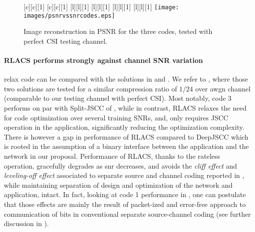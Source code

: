 \begin{figure}[t!]
\begin{center}
[c][c][1]{\scalebox{.8}{image reconstruction PSNR [dB]}}
[c][c][1]{\scalebox{.8}{channel signal to noise ratio [dB]}}
[l][l][1]{\scalebox{\textsizescale}{Code 1, not rateless}}
[l][l][1]{}
[l][l][1]{}
[l][l][1]{\scalebox{\textsizescale}{imperfect CSI, $\epsilon = 0.1$} }
\texttt{[image: images/psnrvssnrcodes.eps]}
\caption{Image reconstruction  in PSNR for the three  codes, tested with perfect CSI testing channel.}
\label{fig:psnrcodes}
\end{center}
\end{figure}

\paragraph*{RLACS performs strongly against channel SNR variation}   \gls{relax} code can be  compared with the solutions in \cite{bourtsoulatze19_deep_joint_sourc_chann_codin} and \cite{tung2024multilevelreliabilityinterfacesemantic}. We refer to  \cite[Figure~10]{tung2024multilevelreliabilityinterfacesemantic}, where those two solutions are tested for a similar compression ratio of $1/24$ over \gls{awgn} channel (comparable to our testing channel with perfect CSI). Most notably, code 3 performs on par with Split-JSCC of \cite{tung2024multilevelreliabilityinterfacesemantic}, while in contrast, RLACS relaxes the need for code optimization over several training SNRs, and, only requires JSCC operation in the application, significantly reducing the optimization complexity. There is however a gap in performance of RLACS compared to DeepJSCC \cite{bourtsoulatze19_deep_joint_sourc_chann_codin} which is rooted in the assumption of a binary interface between the application and the network in our proposal. Performance of RLACS, thanks to the rateless operation, gracefully degrades as \gls{snr} decreases, and avoids the \emph{cliff effect} and \emph{leveling-off effect} associated to separate source and channel coding  reported in \cite{gunduz2024joint}, while maintaining separation of design and optimization of the network and application, intact. In fact, looking at code 1 performance in , one can postulate that those effects are mainly the result of packet-ized and error-free approach to communication of bits in conventional separate source-channel coding (see further discussion in ).

